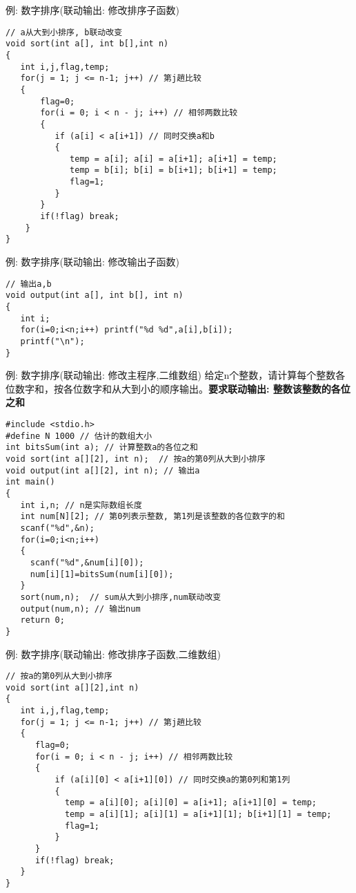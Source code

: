 \begin{frame}{例: 数字排序(联动输出: 修改排序子函数)}
\begin{lstlisting}
// a从大到小排序, b联动改变
void sort(int a[], int b[],int n)
{
   int i,j,flag,temp;
   for(j = 1; j <= n-1; j++) // 第j趟比较
   {
       flag=0;
       for(i = 0; i < n - j; i++) // 相邻两数比较
       {
          if (a[i] < a[i+1]) // 同时交换a和b
          { 
             temp = a[i]; a[i] = a[i+1]; a[i+1] = temp; 
             temp = b[i]; b[i] = b[i+1]; b[i+1] = temp; 
             flag=1;
          }
       }
       if(!flag) break;
    }
}
\end{lstlisting}
\end{frame}

\begin{frame}{例: 数字排序(联动输出: 修改输出子函数)}
\begin{lstlisting}
// 输出a,b
void output(int a[], int b[], int n)
{
   int i;
   for(i=0;i<n;i++) printf("%d %d",a[i],b[i]);
   printf("\n");
}
\end{lstlisting}
\end{frame}

\begin{frame}{例: 数字排序(联动输出: 修改主程序,二维数组)}
给定n个整数，请计算每个整数各位数字和，按各位数字和从大到小的顺序输出。\textbf{要求联动输出: 整数\quad 该整数的各位之和}
\begin{lstlisting}
#include <stdio.h>
#define N 1000 // 估计的数组大小
int bitsSum(int a); // 计算整数a的各位之和
void sort(int a[][2], int n);  // 按a的第0列从大到小排序
void output(int a[][2], int n); // 输出a
int main()
{
   int i,n; // n是实际数组长度 
   int num[N][2]; // 第0列表示整数, 第1列是该整数的各位数字的和  
   scanf("%d",&n);
   for(i=0;i<n;i++) 
   {
     scanf("%d",&num[i][0]); 
     num[i][1]=bitsSum(num[i][0]);
   }
   sort(num,n);  // sum从大到小排序,num联动改变
   output(num,n); // 输出num
   return 0;
}
\end{lstlisting}
\end{frame}

\begin{frame}{例: 数字排序(联动输出: 修改排序子函数,二维数组)}
\begin{lstlisting}
// 按a的第0列从大到小排序
void sort(int a[][2],int n)
{
   int i,j,flag,temp;
   for(j = 1; j <= n-1; j++) // 第j趟比较
   {
      flag=0;
      for(i = 0; i < n - j; i++) // 相邻两数比较
      {
          if (a[i][0] < a[i+1][0]) // 同时交换a的第0列和第1列
          { 
            temp = a[i][0]; a[i][0] = a[i+1]; a[i+1][0] = temp; 
            temp = a[i][1]; a[i][1] = a[i+1][1]; b[i+1][1] = temp; 
            flag=1;
          }
      }
      if(!flag) break;
   }
}
\end{lstlisting}
\end{frame}

